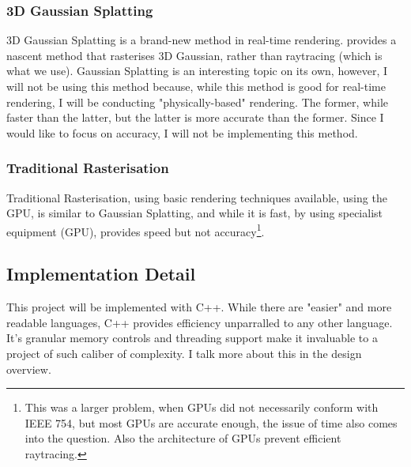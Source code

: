 \documentclass[../main.tex]{subfiles}
\begin{document}
\subsubsection{3D Gaussian Splatting}
3D Gaussian Splatting is a brand-new method in real-time rendering.\cite{kerbl3DGaussianSplatting2023} provides a nascent method that rasterises 3D Gaussian, rather than raytracing (which is what we use). Gaussian Splatting is an interesting topic on its own, however, I will not be using this method because, while this method is good for real-time rendering, I will be conducting "physically-based" rendering. The former, while faster than the latter, but the latter is more accurate than the former. Since I would like to focus on accuracy, I will not be implementing this method.
\subsubsection{Traditional Rasterisation}
Traditional Rasterisation, using basic rendering techniques available, using the GPU, is similar to Gaussian Splatting, and while it is fast, by using specialist equipment (GPU), provides speed but not accuracy\footnote{This was a larger problem, when GPUs did not necessarily conform with IEEE 754, but most GPUs are accurate enough, the issue of time also comes into the question. Also the architecture of GPUs prevent efficient raytracing.}. 

\subsection{Implementation Detail}
This project will be implemented with C++. While there are "easier" and more readable languages, C++ provides efficiency unparralled to any other language. It's granular memory controls and threading support make it invaluable to a project of such caliber of complexity. I talk more about this in the design overview.
\end{document}
